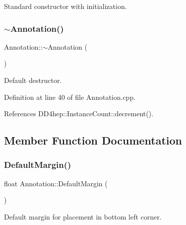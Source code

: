 Standard constructor with initialization. 

\hypertarget{class_d_d4hep_1_1_annotation_a95144855eb445040d47951c668dc5764}{}\label{class_d_d4hep_1_1_annotation_a95144855eb445040d47951c668dc5764} 
\subsubsection{\texorpdfstring{$\sim$\+Annotation()}{~Annotation()}}
{\footnotesize\ttfamily Annotation\+::$\sim$\+Annotation (\begin{DoxyParamCaption}{ }\end{DoxyParamCaption})\hspace{0.3cm}{\ttfamily [virtual]}}



Default destructor. 



Definition at line 40 of file Annotation.\+cpp.



References D\+D4hep\+::\+Instance\+Count\+::decrement().



\subsection{Member Function Documentation}
\hypertarget{class_d_d4hep_1_1_annotation_a8d10a81577c74708c3458905b5d239dc}{}\label{class_d_d4hep_1_1_annotation_a8d10a81577c74708c3458905b5d239dc} 
\subsubsection{\texorpdfstring{Default\+Margin()}{DefaultMargin()}}
{\footnotesize\ttfamily float Annotation\+::\+Default\+Margin (\begin{DoxyParamCaption}{ }\end{DoxyParamCaption})\hspace{0.3cm}{\ttfamily [static]}}



Default margin for placement in bottom left corner. 



